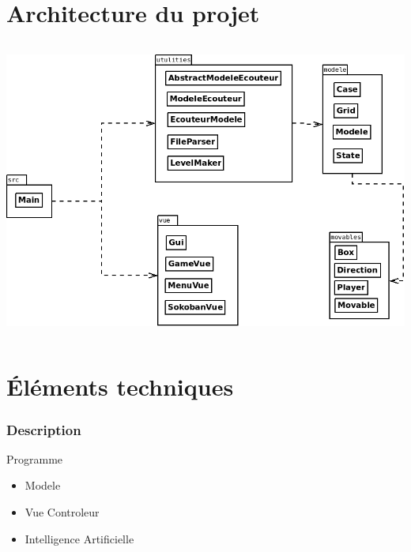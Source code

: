 \documentclass{beamer}
\begin{document}
\section{Architecture du projet}
\begin{frame}
\begin{column}{8cm}
  \includegraphics[scale=0.3]{Diagramme1.png}
\end{column}
\end{frame}

\section{Éléments techniques}
 

\begin{frame}
\frametitle{Description}
\begin{block}{Programme}  
 \begin{itemize}
     \item Modele
     \item Vue Controleur
     \item Intelligence Artificielle
 \end{itemize}
\end{block}
\end{frame}
\end{document}
